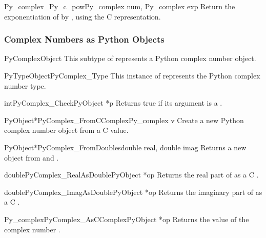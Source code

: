 \documentclass{manual}
\begin{document}
\begin{cfuncdesc}{Py_complex}{_Py_c_pow}{Py_complex num, Py_complex exp}
Return the exponentiation of  by , using the C
 representation.
\end{cfuncdesc}


\subsubsection{Complex Numbers as Python Objects}

\begin{ctypedesc}{PyComplexObject}
This subtype of  represents a Python complex number object.
\end{ctypedesc}

\begin{cvardesc}{PyTypeObject}{PyComplex_Type}
This instance of  represents the Python complex 
number type.
\end{cvardesc}

\begin{cfuncdesc}{int}{PyComplex_Check}{PyObject *p}
Returns true if its argument is a .
\end{cfuncdesc}

\begin{cfuncdesc}{PyObject*}{PyComplex_FromCComplex}{Py_complex v}
Create a new Python complex number object from a C
 value.
\end{cfuncdesc}

\begin{cfuncdesc}{PyObject*}{PyComplex_FromDoubles}{double real, double imag}
Returns a new  object from  and .
\end{cfuncdesc}

\begin{cfuncdesc}{double}{PyComplex_RealAsDouble}{PyObject *op}
Returns the real part of  as a C .
\end{cfuncdesc}

\begin{cfuncdesc}{double}{PyComplex_ImagAsDouble}{PyObject *op}
Returns the imaginary part of  as a C .
\end{cfuncdesc}

\begin{cfuncdesc}{Py_complex}{PyComplex_AsCComplex}{PyObject *op}
Returns the  value of the complex number .
\end{cfuncdesc}
\end{document}
